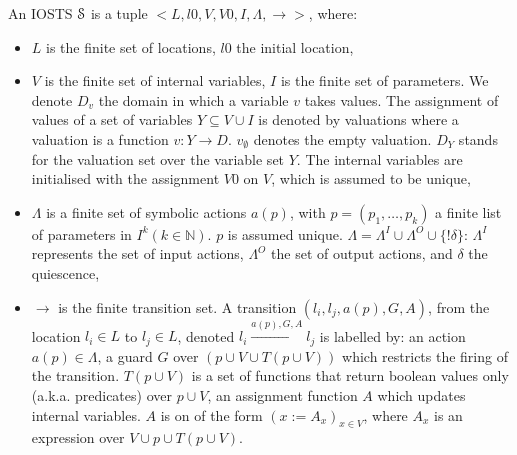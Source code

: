 \begin{definition}[IOSTS]
An IOSTS $\EuScript{S}$ is a tuple $<
L,l0,V,V0,I,\Lambda,\rightarrow>$, where:

\begin{itemize}
\item $L$ is the finite set of locations, $l0$ the initial
location,

\item $V$ is the finite set of internal variables, $I$ is the
finite set of parameters. We denote $D_v$ the domain in which a
variable $v$ takes values. The assignment of values of a set of
variables $Y \subseteq V \cup I$ is denoted by valuations where a
valuation is a function $v: Y \rightarrow D$. $v_\emptyset$
denotes the empty valuation. $D_Y$ stands for the valuation set
over the variable set $Y$. The internal variables are initialised
with the assignment $V0$ on $V$, which is assumed to be unique,

\item $\Lambda$ is a finite set of symbolic actions $a(p)$, with
$p = (p_1,\dots,p_k)$ a finite list of parameters in $I^k(k \in
\mathbb{N})$. $p$ is assumed unique. $\Lambda= \Lambda^I  \cup
\Lambda^O \cup \{!\delta \}$: $\Lambda^I$ represents the set of
input actions, $\Lambda^O$ the set of output actions, and
$\delta$ the quiescence,

\item $\rightarrow$ is the finite transition set. A transition
$(l_i,l_j,a(p),G,A)$, from the location $l_i \in L$ to $l_j \in
L$, denoted $l_i \xrightarrow{a(p),G,A} l_j$ is labelled by: an
action $a(p) \in \Lambda$, a guard  $G$ over $(p \cup V \cup T(p
\cup V))$ which restricts the firing of the transition. $T(p \cup
V)$ is a set of functions that return boolean values only (a.k.a.
predicates) over $p \cup V$, an assignment function $A$ which
updates internal variables. $A$ is on of the form $(x:=A_x)_{x\in
V}$, where $A_x$ is an expression over $V \cup p \cup T(p \cup
V)$.
\end{itemize}

\end{definition}
